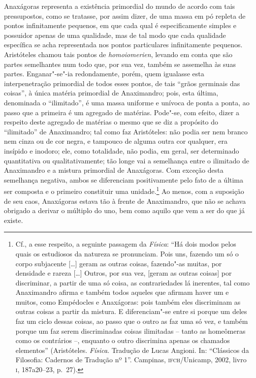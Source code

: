 Anaxágoras representa a existência primordial do mundo de acordo com
tais pressupostos, como se tratasse, por assim dizer, de uma massa em
pó repleta de pontos infinitamente pequenos, em que cada qual é
especificamente simples e possuidor apenas de uma qualidade, mas de tal
modo que cada qualidade específica se acha representada nos pontos
particulares infinitamente pequenos. Aristóteles chamou tais pontos de
\textit{homoiomerien}, levando em conta que são partes semelhantes num
todo que, por sua vez, também se assemelha às suas partes.		\label{suaspartes}
Enganar"-se"-ia redondamente, porém, quem igualasse esta interpenetração
primordial de todos esses pontos, de tais ``grãos germinais das coisas'',
à única matéria primordial de Anaximandro; pois, esta última,
denominada o ``ilimitado'', é uma massa uniforme e unívoca de ponta a
ponta, ao passo que a primeira é um agregado de matérias. Pode"-se, com
efeito, dizer a respeito deste agregado de matérias o mesmo que se diz
a propósito do ``ilimitado'' de Anaximandro; tal como faz Aristóteles:
não podia ser nem branco nem cinza ou de cor negra, e tampouco de
alguma outra cor qualquer, era insípido e inodoro; ele, como
totalidade, não podia, em geral, ser determinado quantitativa ou
qualitativamente; tão longe vai a semelhança entre o ilimitado de
Anaximandro e a mistura primordial de Anaxágoras. Com exceção desta
semelhança negativa, ambos se diferenciam positivamente pelo fato de a
última ser composta e o primeiro constituir uma unidade.\footnote{ Cf.,
a esse respeito, a seguinte passagem da \textit{Física}: ``Há dois modos
pelos quais os estudiosos da natureza se pronunciam. Pois uns, fazendo
um só o corpo subjacente [\ldots] geram as outras coisas, fazendo"-as
muitas, por densidade e rareza [\ldots] Outros, por sua vez, [geram as
outras coisas] por discriminar, a partir de uma só coisa, as
contrariedades lá inerentes, tal como Anaximandro afirma e também todos
aqueles que afirmam haver um e muitos, como Empédocles e Anaxágoras:
pois também eles discriminam as outras coisas a partir da mistura. E
diferenciam"-se entre si porque um deles faz um ciclo dessas coisas, ao
passo que o outro as faz uma só vez, e também porque um faz serem
discriminadas coisas ilimitadas -- tanto as homeômeras como os
contrários --, enquanto o outro discrimina apenas os chamados elementos''
(Aristóteles. \textit{Física}. Tradução de Lucas Angioni. In: ``Clássicos
da Filosofia: Cadernos de Tradução nº 1''. Campinas, \textsc{ifch}/Unicamp, 2002,
livro \textsc{i}, 187a20--23, p.~27).} Ao menos, com a suposição de seu
caos, Anaxágoras estava tão à frente de Anaximandro, que não se achava
obrigado a derivar o múltiplo do uno, bem como aquilo que vem a ser do que já existe.


